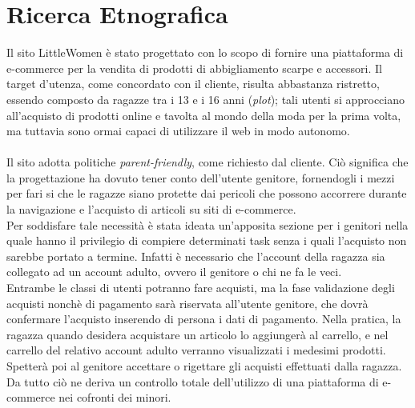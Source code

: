 \documentclass[12pt,a4paper]{report}
\begin{document}
\chapter{Ricerca Etnografica}
Il sito LittleWomen è stato progettato con lo scopo di fornire una piattaforma di e-commerce per la vendita di prodotti di abbigliamento scarpe e accessori. Il target d'utenza, come concordato con il cliente, risulta abbastanza ristretto, essendo composto da ragazze tra i 13 e i 16 anni (\textit{plot}); tali utenti si approcciano all'acquisto di prodotti online e tavolta al mondo della moda per la prima volta, ma tuttavia sono ormai capaci di utilizzare il web in modo autonomo.\\ \\ Il sito adotta politiche \textit{parent-friendly}, come richiesto dal cliente. Ciò significa che la progettazione ha dovuto tener conto dell'utente genitore, fornendogli i mezzi per fari si che le ragazze siano protette dai pericoli che possono accorrere durante la navigazione e l'acquisto di articoli su siti di e-commerce.\\
Per soddisfare tale necessità è stata ideata un'apposita sezione per i genitori nella quale hanno il privilegio di compiere determinati task senza i quali l'acquisto non sarebbe portato a termine. Infatti è necessario che l'account della ragazza sia collegato ad un account adulto, ovvero il genitore o chi ne fa le veci. \\Entrambe le classi di utenti potranno fare acquisti, ma la fase validazione degli acquisti nonchè di pagamento sarà riservata all'utente genitore, che dovrà confermare l'acquisto inserendo di persona i dati di pagamento. Nella pratica, la ragazza quando desidera acquistare un articolo lo aggiungerà al carrello, e nel carrello del relativo account adulto verranno visualizzati i medesimi prodotti. \\ Spetterà poi al genitore accettare o rigettare gli acquisti effettuati dalla ragazza. Da tutto ciò ne deriva un controllo totale dell'utilizzo di una piattaforma di e-commerce nei cofronti dei minori.
\end{document}
